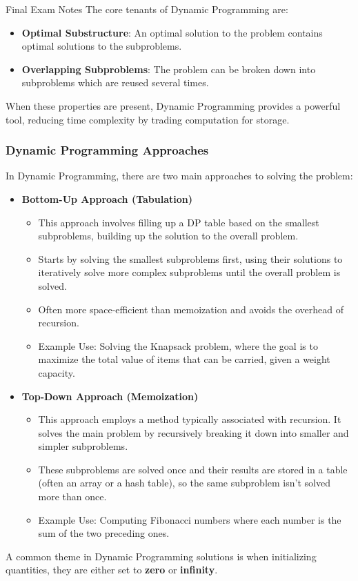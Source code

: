 \begin{examnotes}{Final Exam Notes}
    The core tenants of Dynamic Programming are:

    \begin{itemize}
        \item \textbf{Optimal Substructure}: An optimal solution to the problem contains optimal solutions to the subproblems.
        \item \textbf{Overlapping Subproblems}: The problem can be broken down into subproblems which are reused several times.
    \end{itemize}
    When these properties are present, Dynamic Programming provides a powerful tool, reducing time complexity by trading computation for storage.

    \subsubsection*{Dynamic Programming Approaches}

    In Dynamic Programming, there are two main approaches to solving the problem:

    \begin{itemize}
        \item \textbf{Bottom-Up Approach (Tabulation)}
        \begin{itemize}
            \item This approach involves filling up a DP table based on the smallest subproblems, building up the solution to the overall problem.
            \item Starts by solving the smallest subproblems first, using their solutions to iteratively solve more complex subproblems until the overall problem is solved.
            \item Often more space-efficient than memoization and avoids the overhead of recursion.
            \item Example Use: Solving the Knapsack problem, where the goal is to maximize the total value of items that can be carried, given a weight capacity.
        \end{itemize}
        \item \textbf{Top-Down Approach (Memoization)}
        \begin{itemize}
            \item This approach employs a method typically associated with recursion. It solves the main problem by recursively breaking it down into smaller and simpler subproblems.
            \item These subproblems are solved once and their results are stored in a table (often an array or a hash table), so the same subproblem isn’t solved more than once.
            \item Example Use: Computing Fibonacci numbers where each number is the sum of the two preceding ones.
        \end{itemize}
    \end{itemize}
    A common theme in Dynamic Programming solutions is when initializing quantities, they are either set to \textbf{zero} or \textbf{infinity}.


\end{examnotes}
